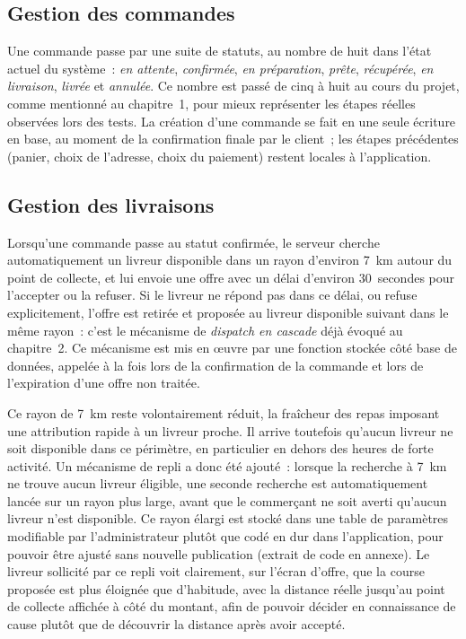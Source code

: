 \documentclass[12pt,fleqn,a4paper]{report}
\begin{document}
\begin{justify}
\subsection{Gestion des commandes}

Une commande passe par une suite de statuts, au nombre de huit dans l'état actuel du système~: \textit{en attente}, \textit{confirmée}, \textit{en préparation}, \textit{prête}, \textit{récupérée}, \textit{en livraison}, \textit{livrée} et \textit{annulée}. Ce nombre est passé de cinq à huit au cours du projet, comme mentionné au chapitre~1, pour mieux représenter les étapes réelles observées lors des tests. La création d'une commande se fait en une seule écriture en base, au moment de la confirmation finale par le client~; les étapes précédentes (panier, choix de l'adresse, choix du paiement) restent locales à l'application.

\subsection{Gestion des livraisons}

Lorsqu'une commande passe au statut confirmée, le serveur cherche automatiquement un livreur disponible dans un rayon d'environ 7~km autour du point de collecte, et lui envoie une offre avec un délai d'environ 30~secondes pour l'accepter ou la refuser. Si le livreur ne répond pas dans ce délai, ou refuse explicitement, l'offre est retirée et proposée au livreur disponible suivant dans le même rayon~: c'est le mécanisme de \textit{dispatch en cascade} déjà évoqué au chapitre~2. Ce mécanisme est mis en œuvre par une fonction stockée côté base de données, appelée à la fois lors de la confirmation de la commande et lors de l'expiration d'une offre non traitée.

Ce rayon de 7~km reste volontairement réduit, la fraîcheur des repas imposant une attribution rapide à un livreur proche. Il arrive toutefois qu'aucun livreur ne soit disponible dans ce périmètre, en particulier en dehors des heures de forte activité. Un mécanisme de repli a donc été ajouté~: lorsque la recherche à 7~km ne trouve aucun livreur éligible, une seconde recherche est automatiquement lancée sur un rayon plus large, avant que le commerçant ne soit averti qu'aucun livreur n'est disponible. Ce rayon élargi est stocké dans une table de paramètres modifiable par l'administrateur plutôt que codé en dur dans l'application, pour pouvoir être ajusté sans nouvelle publication (extrait de code en annexe). Le livreur sollicité par ce repli voit clairement, sur l'écran d'offre, que la course proposée est plus éloignée que d'habitude, avec la distance réelle jusqu'au point de collecte affichée à côté du montant, afin de pouvoir décider en connaissance de cause plutôt que de découvrir la distance après avoir accepté.


\end{justify}
\end{document}
